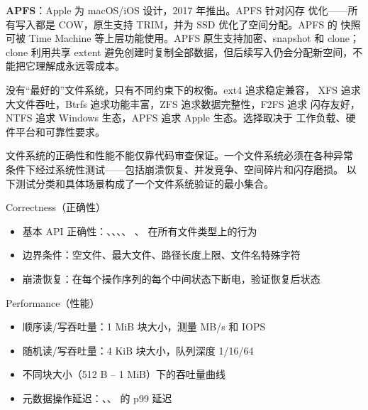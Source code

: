 \begin{filesystemlayout}
\noindent\textbf{APFS}：Apple 为 macOS/iOS 设计，2017 年推出。APFS 针对闪存
优化——所有写入都是 COW，原生支持 TRIM，并为 SSD 优化了空间分配。APFS 的
快照可被 Time Machine 等上层功能使用。APFS 原生支持加密、snapshot 和 clone；
clone 利用共享 extent 避免创建时复制全部数据，但后续写入仍会分配新空间，不能把它理解成永远零成本。

\begin{keyidea}
没有``最好的''文件系统，只有不同约束下的权衡。ext4 追求稳定兼容，
XFS 追求大文件吞吐，Btrfs 追求功能丰富，ZFS 追求数据完整性，F2FS 追求
闪存友好，NTFS 追求 Windows 生态，APFS 追求 Apple 生态。选择取决于
工作负载、硬件平台和可靠性要求。
\end{keyidea}


文件系统的正确性和性能不能仅靠代码审查保证。一个文件系统必须在各种异常
条件下经过系统性测试——包括崩溃恢复、并发竞争、空间碎片和闪存磨损。
以下测试分类和具体场景构成了一个文件系统验证的最小集合。


\begin{rubricbox}{Correctness（正确性）}
\begin{itemize}\tightlist
\item 基本 API 正确性：、、、、
      、 在所有文件类型上的行为
\item 边界条件：空文件、最大文件、路径长度上限、文件名特殊字符
\item 崩溃恢复：在每个操作序列的每个中间状态下断电，验证恢复后状态
\end{itemize}
\end{rubricbox}

\begin{rubricbox}{Performance（性能）}
\begin{itemize}\tightlist
\item 顺序读/写吞吐量：1 MiB 块大小，测量 MB/s 和 IOPS
\item 随机读/写吞吐量：4 KiB 块大小，队列深度 1/16/64
\item 不同块大小（512 B -- 1 MiB）下的吞吐量曲线
\item 元数据操作延迟：、、 的 p99 延迟
\end{itemize}
\end{rubricbox}


\end{filesystemlayout}
